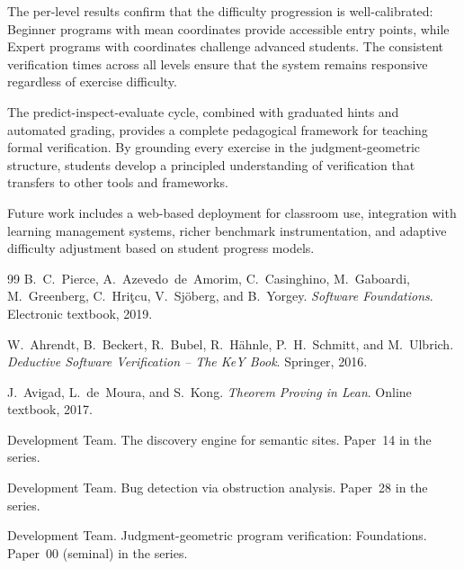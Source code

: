 \documentclass[11pt]{article}
\begin{document}
The per-level results confirm that the difficulty progression is
well-calibrated: Beginner programs with \ppLXVIBeginnerMeanCoords{} mean
coordinates provide accessible entry points, while Expert programs with
\ppLXVIExpertMeanCoords{} coordinates challenge advanced students. The
consistent verification times across all levels ensure that the system
remains responsive regardless of exercise difficulty.

The predict-inspect-evaluate cycle, combined with graduated hints and
automated grading, provides a complete pedagogical framework for teaching
formal verification. By grounding every exercise in the judgment-geometric
structure, students develop a principled understanding of verification that
transfers to other tools and frameworks.

Future work includes a web-based deployment for classroom use, integration
with learning management systems, richer benchmark instrumentation, and
adaptive difficulty adjustment based on student progress models.


\begin{thebibliography}{99}
B.~C.~Pierce, A.~Azevedo~de~Amorim, C.~Casinghino, M.~Gaboardi,
M.~Greenberg, C.~Hri\c{t}cu, V.~Sj{\"o}berg, and B.~Yorgey.
\newblock \emph{Software Foundations}.
\newblock Electronic textbook, 2019.

W.~Ahrendt, B.~Beckert, R.~Bubel, R.~H\"ahnle, P.~H.~Schmitt, and
M.~Ulbrich.
\newblock \emph{Deductive Software Verification -- The KeY Book}.
\newblock Springer, 2016.

J.~Avigad, L.~de~Moura, and S.~Kong.
\newblock \emph{Theorem Proving in Lean}.
\newblock Online textbook, 2017.

\JuGeo{} Development Team.
\newblock The discovery engine for semantic sites.
\newblock Paper~14 in the \JuGeo{} series.

\JuGeo{} Development Team.
\newblock Bug detection via obstruction analysis.
\newblock Paper~28 in the \JuGeo{} series.

\JuGeo{} Development Team.
\newblock Judgment-geometric program verification: Foundations.
\newblock Paper~00 (seminal) in the \JuGeo{} series.
\end{thebibliography}
\end{document}
